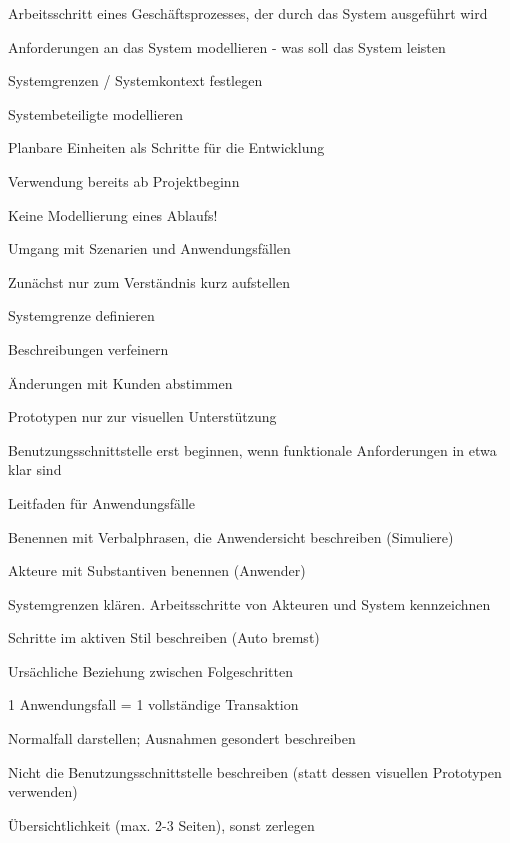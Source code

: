 \documentclass[a4paper]{article}
\begin{document}
\begin{multicols}{3}
\begin{itemize*}
\begin{itemize*}
            \item Arbeitsschritt eines Geschäftsprozesses, der durch das System ausgeführt wird
            \item Anforderungen an das System modellieren - was soll das System leisten
            \item Systemgrenzen / Systemkontext festlegen
            \item Systembeteiligte modellieren
            \item Planbare Einheiten als Schritte für die Entwicklung
            \item Verwendung bereits ab Projektbeginn
            \item Keine Modellierung eines Ablaufs!
          \end{itemize*}
    \item Umgang mit Szenarien und Anwendungsfällen
          \begin{itemize*}
            \item Zunächst nur zum Verständnis kurz aufstellen
            \item Systemgrenze definieren
            \item Beschreibungen verfeinern
            \item Änderungen mit Kunden abstimmen
            \item Prototypen nur zur visuellen Unterstützung
            \item Benutzungsschnittstelle erst beginnen, wenn funktionale Anforderungen in etwa klar sind
          \end{itemize*}
  \end{itemize*}

  Leitfaden für Anwendungsfälle
  \begin{itemize*}
    \item Benennen mit Verbalphrasen, die Anwendersicht beschreiben (Simuliere)
    \item Akteure mit Substantiven benennen (Anwender)
    \item Systemgrenzen klären. Arbeitsschritte von Akteuren und System kennzeichnen
    \item Schritte im aktiven Stil beschreiben (Auto bremst)
    \item Ursächliche Beziehung zwischen Folgeschritten
    \item 1 Anwendungsfall = 1 vollständige Transaktion
    \item Normalfall darstellen; Ausnahmen gesondert beschreiben
    \item Nicht die Benutzungsschnittstelle beschreiben (statt dessen visuellen Prototypen verwenden)
    \item Übersichtlichkeit (max. 2-3 Seiten), sonst zerlegen
  \end{itemize*}


\end{multicols}
\end{document}
